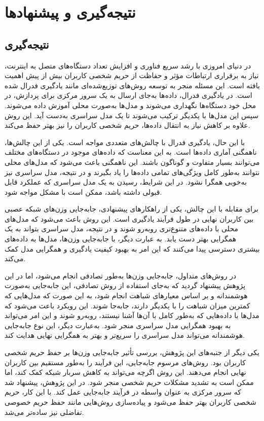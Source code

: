 \chapter{نتیجه‌گیری و پیشنهاد‌ها}

\section{نتیجه‌گیری}

در دنیای امروزی با رشد سریع فناوری و افزایش تعداد دستگاه‌های متصل به اینترنت، نیاز به برقراری ارتباطات مؤثر و حفاظت از حریم شخصی کاربران بیش از پیش اهمیت یافته است. این مسئله منجر به توسعه روش‌های توزیع‌شده‌ای مانند یادگیری فدرال شده است. در یادگیری فدرال، داده‌ها به‌جای ارسال به یک سرور مرکزی برای پردازش، در محل خود دستگاه‌ها نگهداری می‌شوند و مدل‌ها به‌صورت محلی آموزش داده می‌شوند. سپس این مدل‌ها با یکدیگر ترکیب می‌شوند تا یک مدل سراسری به‌دست آید. این روش علاوه بر کاهش نیاز به انتقال داده‌ها، حریم شخصی کاربران را نیز بهتر حفظ می‌کند.

با این حال، یادگیری فدرال با چالش‌های متعددی مواجه است. یکی از این چالش‌ها، ناهمگنی آماری داده‌ها است. به این معناست که داده‌های موجود در دستگاه‌های مختلف می‌توانند بسیار متفاوت و گوناگون باشند. این ناهمگنی باعث می‌شود که مدل‌های محلی نتوانند به‌طور کامل ویژگی‌های تمامی داده‌ها را یاد بگیرند و در نتیجه، مدل سراسری نیز به‌خوبی همگرا نشود. در این شرایط، رسیدن به یک مدل سراسری که عملکرد قابل قبولی داشته باشد، ممکن است با مشکل مواجه شود.

برای مقابله با این چالش، یکی از راهکارهای پیشنهادی، جابه‌جایی وزن‌های شبکه عصبی بین کاربران نهایی در طول فرآیند یادگیری است. این روش باعث می‌شود که مدل‌های محلی با داده‌های متنوع‌تری روبه‌رو شوند و در نتیجه، مدل سراسری بتواند به یک همگرایی بهتر دست یابد. به عبارت دیگر، با جابه‌جایی وزن‌ها، مدل‌ها به داده‌های بیشتری دسترسی پیدا می‌کنند که این امر به بهبود کیفیت یادگیری و همگرایی مدل کمک می‌کند.

در روش‌های متداول، جابه‌جایی وزن‌ها به‌طور تصادفی انجام می‌شود، اما در این پژوهش پیشنهاد گردید که به‌جای استفاده از روش تصادفی، این جابه‌جایی به‌صورت هوشمندانه و بر اساس معیارهای شباهت انجام شود، به این صورت که مدل‌هایی که کمترین میزان شباهت را با یکدیگر دارند، جابه‌جا شوند. این رویکرد باعث می‌شود که مدل‌ها با داده‌هایی که به‌طور کامل با آن‌ها آشنا نیستند، روبه‌رو شوند و این امر می‌تواند به بهبود همگرایی مدل سراسری منجر شود. به‌عبارت دیگر، این نوع جابه‌جایی هوشمندانه می‌تواند مدل سراسری را سریع‌تر و بهتر به همگرایی نهایی هدایت کند.

یکی دیگر از جنبه‌های این پژوهش، بررسی تأثیر جابه‌جایی وزن‌ها بر حفظ حریم شخصی کاربران بود. روش‌های مرسوم جابه‌جایی، این فرآیند را به‌طور مستقیم بین کاربران نهایی انجام می‌دهند. این روش اگرچه می‌تواند به کاهش سربار شبکه کمک کند، اما ممکن است به تشدید مشکلات حریم شخصی منجر شود. در این پژوهش، پیشنهاد شد که سرور مرکزی به عنوان واسطه در فرآیند جابه‌جایی عمل کند. با این کار، حریم شخصی کاربران بهتر حفظ می‌شود و پیاده‌سازی روش‌هایی مانند حفظ حریم خصوصی تفاضلی نیز ساده‌تر می‌شد.

